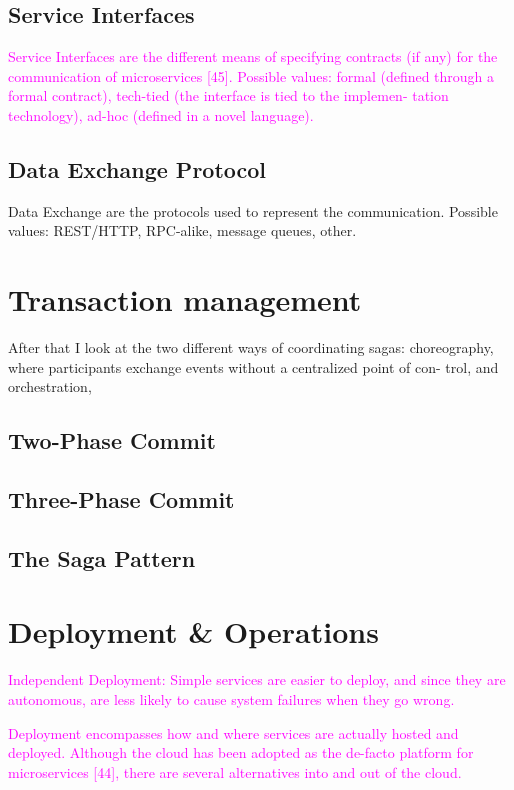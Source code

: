 \documentclass[thesis=M,english,hidelinks]{FITthesis}[2012/10/20]
\begin{document}
\subsection{Service Interfaces}
\textcolor{magenta}{Service Interfaces are the different means of specifying contracts (if any) for the communication of microservices [45]. Possible values: formal (defined through a formal contract), tech-tied (the interface is tied to the implemen- tation technology), ad-hoc (defined in a novel language).}


\subsection{Data Exchange Protocol}
Data Exchange are the protocols used to represent the communication. Possible values: REST/HTTP, RPC-alike, message queues, other.

% 
% 
\section{Transaction management}
\label{sec:transaction_management}
After that I look at the two different ways of coordinating sagas: choreography, where participants exchange events without a centralized point of con- trol, and orchestration, 

\subsection{Two-Phase Commit}
\subsection{Three-Phase Commit}
\subsection{The Saga Pattern}


\section{Deployment \& Operations}
\textcolor{magenta}{Independent Deployment: Simple services are easier to deploy, and since they are autonomous, are less likely to cause system failures when they go wrong.}

\textcolor{magenta}{Deployment encompasses how and where services are actually hosted and deployed. Although the cloud has been adopted as the de-facto platform for microservices [44], there are several alternatives into and out of the cloud.}
\end{document}
